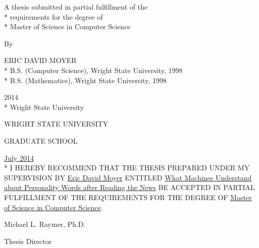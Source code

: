 \frontmatter
\begin{titlepage}
 

\singlespace
\begin{center}
 {\Large\uppercase{\thesistitle}}

 \vspace{2in}
 
 A thesis submitted in partial fulfillment of the \\*
 requirements for the degree of \\*
 Master of Science in Computer Science

 \vspace{1in}
 
 By

 \vspace{1in}
 
 \uppercase{Eric David Moyer}\\*
 B.S. (Computer Science), Wright State University, 1998\\*
 B.S. (Mathematics), Wright State University, 1998

 \vspace{2in}
 
 2014\\*
 Wright State University
\end{center}

\end{titlepage}

\begin{center}
 \uppercase{Wright State University}
 
 
 \uppercase{Graduate School}
\end{center}

\singlespace

\hfill \underline{July 2014}\\*
I HEREBY RECOMMEND THAT THE THESIS PREPARED UNDER MY SUPERVISION BY \uline{Eric 
David Moyer} ENTITLED \uline{What Machines Understand about Personality Words 
after Reading the News} BE ACCEPTED IN PARTIAL FULFILLMENT OF THE REQUIREMENTS 
FOR THE DEGREE OF \uline{Master of Science in Computer Science}.

\vspace{0.5in}\hspace{2.5in}\underline{\hspace{3in}}

\hspace{2.5in}Michael L. Raymer, Ph.D.

\hspace{2.5in}Thesis Director


